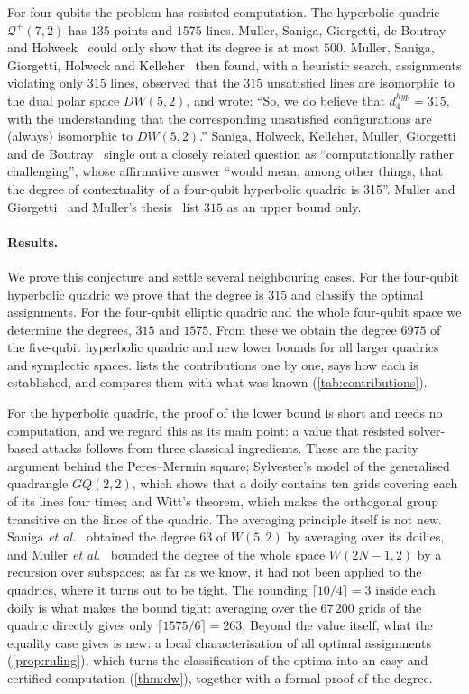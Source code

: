 \documentclass[11pt]{article}
\theoremstyle{definition}
\theoremstyle{remark}
\newcommand{\Qp}{\mathcal{Q}^{+}}
\begin{document}
For four qubits the problem has resisted computation.
The hyperbolic quadric $\Qp(7,2)$ has $135$ points and $1575$ lines.
Muller, Saniga, Giorgetti, de Boutray and Holweck~\cite[Table~1]{Muller23} could only show that its degree is at most $500$.
Muller, Saniga, Giorgetti, Holweck and Kelleher~\cite[\S5.1.2]{Muller24} then found, with a heuristic search, assignments violating only $315$ lines, observed that the $315$ unsatisfied lines are isomorphic to the dual polar space $DW(5,2)$, and wrote: ``So, we do believe that $d^{hyp}_4=315$, with the understanding that the corresponding unsatisfied configurations are (always) isomorphic to $DW(5,2)$.''
Saniga, Holweck, Kelleher, Muller, Giorgetti and de Boutray~\cite[p.~24]{Saniga24hex} single out a closely related question as ``computationally rather challenging'', whose affirmative answer ``would mean, among other things, that the degree of contextuality of a four-qubit hyperbolic quadric is 315''.
Muller and Giorgetti~\cite[\S5.3]{MullerGiorgetti24} and Muller's thesis~\cite{MullerThesis} list $315$ as an upper bound only.

\paragraph{Results.}
We prove this conjecture and settle several neighbouring cases.
For the four-qubit hyperbolic quadric we prove that the degree is $315$ and classify the optimal assignments.
For the four-qubit elliptic quadric and the whole four-qubit space we determine the degrees, $315$ and $1575$.
From these we obtain the degree $6975$ of the five-qubit hyperbolic quadric and new lower bounds for all larger quadrics and symplectic spaces.
 lists the contributions one by one, says how each is established, and compares them with what was known (\cref{tab:contributions}).

For the hyperbolic quadric, the proof of the lower bound is short and needs no computation, and we regard this as its main point: a value that resisted solver-based attacks follows from three classical ingredients.
These are the parity argument behind the Peres--Mermin square; Sylvester's model of the generalised quadrangle $GQ(2,2)$, which shows that a doily contains ten grids covering each of its lines four times; and Witt's theorem, which makes the orthogonal group transitive on the lines of the quadric.
The averaging principle itself is not new. Saniga \emph{et al.}~\cite[\S4.1]{Saniga24hex} obtained the degree $63$ of $W(5,2)$ by averaging over its doilies, and Muller \emph{et al.}~\cite[\S4]{Muller24} bounded the degree of the whole space $W(2N-1,2)$ by a recursion over subspaces; as far as we know, it had not been applied to the quadrics, where it turns out to be tight.
The rounding $\lceil 10/4\rceil=3$ inside each doily is what makes the bound tight: averaging over the $67\,200$ grids of the quadric directly gives only $\lceil1575/6\rceil=263$.
Beyond the value itself, what the equality case gives is new: a local characterisation of all optimal assignments (\cref{prop:ruling}), which turns the classification of the optima into an easy and certified computation (\cref{thm:dw}), together with a formal proof of the degree.
\end{document}
